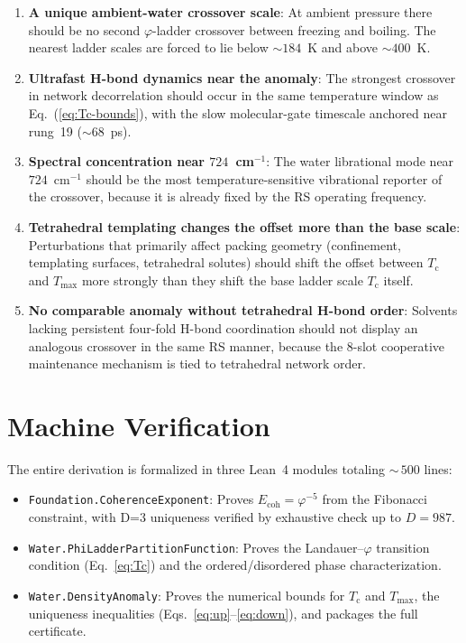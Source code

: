 \documentclass[aps,prl,twocolumn,superscriptaddress,showpacs,floatfix]{revtex4-2}
\newcommand{\Ecoh}{E_{\mathrm{coh}}}
\newcommand{\Tc}{T_{\mathrm{c}}}
\newcommand{\Tmax}{T_{\mathrm{max}}}
\newcommand{\phig}{\varphi}
\begin{document}
\begin{enumerate}
\item \textbf{A unique ambient-water crossover scale}: At ambient pressure there should be no second $\phig$-ladder crossover between freezing and boiling. The nearest ladder scales are forced to lie below ${\sim}184$~K and above ${\sim}400$~K.

\item \textbf{Ultrafast H-bond dynamics near the anomaly}: The strongest crossover in network decorrelation should occur in the same temperature window as Eq.~(\ref{eq:Tc-bounds}), with the slow molecular-gate timescale anchored near rung~19 (${\sim}68$~ps).

\item \textbf{Spectral concentration near $724$~cm$^{-1}$}: The water librational mode near $724$~cm$^{-1}$ should be the most temperature-sensitive vibrational reporter of the crossover, because it is already fixed by the RS operating frequency.

\item \textbf{Tetrahedral templating changes the offset more than the base scale}: Perturbations that primarily affect packing geometry (confinement, templating surfaces, tetrahedral solutes) should shift the offset between $\Tc$ and $\Tmax$ more strongly than they shift the base ladder scale $\Tc$ itself.

\item \textbf{No comparable anomaly without tetrahedral H-bond order}: Solvents lacking persistent four-fold H-bond coordination should not display an analogous crossover in the same RS manner, because the 8-slot cooperative maintenance mechanism is tied to tetrahedral network order.
\end{enumerate}

\section{Machine Verification}

The entire derivation is formalized in three Lean~4 modules totaling ${\sim}\,500$ lines:

\begin{itemize}
\item \texttt{Foundation.CoherenceExponent}: Proves $\Ecoh = \phig^{-5}$ from the Fibonacci constraint, with D=3 uniqueness verified by exhaustive check up to $D = 987$.

\item \texttt{Water.PhiLadderPartitionFunction}: Proves the Landauer--$\phig$ transition condition (Eq.~\ref{eq:Tc}) and the ordered/disordered phase characterization.

\item \texttt{Water.DensityAnomaly}: Proves the numerical bounds for $\Tc$ and $\Tmax$, the uniqueness inequalities (Eqs.~\ref{eq:up}--\ref{eq:down}), and packages the full certificate.
\end{itemize}
\end{document}
